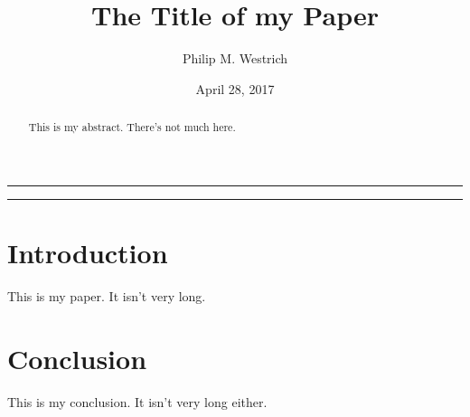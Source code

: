 \documentclass[10pt]{article}
\title{The Title of my Paper}
\author{Philip M. Westrich}
\date{April 28, 2017}
\begin{document}
\maketitle
\vspace{-0.3in}\noindent\rule{\linewidth}{0.4pt}
\doublespacing

\begin{abstract}

    This is my abstract. There's not much here.\\
 
\end{abstract}

\vspace{-0.3in}\noindent\rule{\linewidth}{0.4pt}

\section{Introduction}

This is my paper. It isn't very long.

\section{Conclusion}

This is my conclusion. It isn't very long either.
\end{document}
